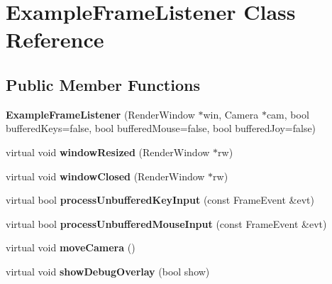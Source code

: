 \hypertarget{class_example_frame_listener}{
\section{ExampleFrameListener Class Reference}
\label{class_example_frame_listener}
}
\subsection*{Public Member Functions}
\begin{DoxyCompactItemize}
\item 
\hypertarget{class_example_frame_listener_ac6f8a3b696f634920165d242ba257f34}{
{\bfseries ExampleFrameListener} (RenderWindow $\ast$win, Camera $\ast$cam, bool bufferedKeys=false, bool bufferedMouse=false, bool bufferedJoy=false)}
\label{class_example_frame_listener_ac6f8a3b696f634920165d242ba257f34}

\item 
\hypertarget{class_example_frame_listener_a74d66b40558f80872929d01ebb2dd496}{
virtual void {\bfseries windowResized} (RenderWindow $\ast$rw)}
\label{class_example_frame_listener_a74d66b40558f80872929d01ebb2dd496}

\item 
\hypertarget{class_example_frame_listener_ae02dd5ad54de05111884278ba095aa61}{
virtual void {\bfseries windowClosed} (RenderWindow $\ast$rw)}
\label{class_example_frame_listener_ae02dd5ad54de05111884278ba095aa61}

\item 
\hypertarget{class_example_frame_listener_a01cb386566a697e24609cc22a5761001}{
virtual bool {\bfseries processUnbufferedKeyInput} (const FrameEvent \&evt)}
\label{class_example_frame_listener_a01cb386566a697e24609cc22a5761001}

\item 
\hypertarget{class_example_frame_listener_a3fd8fe28c4a25c0731dfb1db1410044e}{
virtual bool {\bfseries processUnbufferedMouseInput} (const FrameEvent \&evt)}
\label{class_example_frame_listener_a3fd8fe28c4a25c0731dfb1db1410044e}

\item 
\hypertarget{class_example_frame_listener_a4d837d15b7e7779f4e9ccf9dfdc128e7}{
virtual void {\bfseries moveCamera} ()}
\label{class_example_frame_listener_a4d837d15b7e7779f4e9ccf9dfdc128e7}

\item 
\hypertarget{class_example_frame_listener_aa05030172b3875dc93019c69e4a98bff}{
virtual void {\bfseries showDebugOverlay} (bool show)}
\label{class_example_frame_listener_aa05030172b3875dc93019c69e4a98bff}


\end{DoxyCompactItemize}
